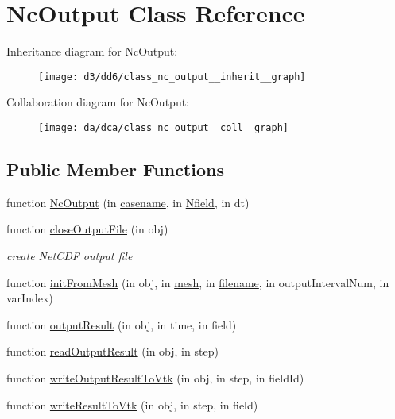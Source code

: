 \hypertarget{class_nc_output}{}\section{Nc\+Output Class Reference}
\label{class_nc_output}


Inheritance diagram for Nc\+Output\+:
\nopagebreak
\begin{figure}[H]
\begin{center}
\leavevmode
\texttt{[image: d3/dd6/class\_nc\_output\_\_inherit\_\_graph]}
\end{center}
\end{figure}


Collaboration diagram for Nc\+Output\+:
\nopagebreak
\begin{figure}[H]
\begin{center}
\leavevmode
\texttt{[image: da/dca/class\_nc\_output\_\_coll\_\_graph]}
\end{center}
\end{figure}
\subsection*{Public Member Functions}
\begin{DoxyCompactItemize}
\item 
function \hyperlink{class_nc_output_aeb0d692f81104439d3dc1dc4c047aa4e}{Nc\+Output} (in \hyperlink{class_abstract_output_file_a84df82b3a07c6e5eb1f92f21a74fa1e4}{casename}, in \hyperlink{class_abstract_output_file_afdf632429d019dff27d7f29102512101}{Nfield}, in dt)
\item 
function \hyperlink{class_nc_output_ac766996a80842432c5ede0becf460e5e}{close\+Output\+File} (in obj)
\begin{DoxyCompactList}\small\item\em create Net\+C\+DF output file \end{DoxyCompactList}\item 
function \hyperlink{class_nc_output_ac9f34fb7ff762f3cf99af6d755b26a8f}{init\+From\+Mesh} (in obj, in \hyperlink{class_abstract_output_file_a499c10c99f2eece91673bc8b8d1d1e99}{mesh}, in \hyperlink{class_nc_output_af85a3bdf009a9445c2939d831bcde62b}{filename}, in output\+Interval\+Num, in var\+Index)
\item 
function \hyperlink{class_nc_output_a04d2728dec95172251fa852ed555788d}{output\+Result} (in obj, in time, in field)
\item 
function \hyperlink{class_nc_output_a169e1e14b2db316b5cc175104d9e0bbe}{read\+Output\+Result} (in obj, in step)
\item 
function \hyperlink{class_nc_output_a322c1834a5530779a16d26499dc68223}{write\+Output\+Result\+To\+Vtk} (in obj, in step, in field\+Id)
\item 
function \hyperlink{class_nc_output_aef07161907f8e2d91aae898a8f9a17a7}{write\+Result\+To\+Vtk} (in obj, in step, in field)
\end{DoxyCompactItemize}
